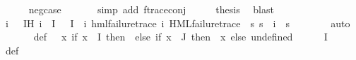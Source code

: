 \begin{isabellebody}
\ \ \ \ \isamarkupfalse%
\ neg{\isacharunderscore}{\kern0pt}case\ \isanewline
\ \ \ \ \isamarkupfalse%
\ {\isacharparenleft}{\kern0pt}simp\ add{\isacharcolon}{\kern0pt}\ f{\isacharunderscore}{\kern0pt}trace{\isacharunderscore}{\kern0pt}conj{\isacharparenright}{\kern0pt}\isanewline
\ \ \isamarkupfalse%
\ \isamarkupfalse%
\ {\isacharquery}{\kern0pt}thesis\ \isamarkupfalse%
\ blast\isanewline
{}\isamarkupfalse%
\isanewline
\ \ \isamarkupfalse%
\ {}\isanewline
\ \ \isamarkupfalse%
\ \isamarkupfalse%
\ i\ {\isasympsi}\ \ IH{\isacharcolon}{\kern0pt}\ {\isachardoublequoteopen}i{\isasymin}{\isasymPhi}\ {\isacharbackquote}{\kern0pt}\ I{\isachardoublequoteclose}\ {\isachardoublequoteopen}{\isasymPhi}\ {\isacharbackquote}{\kern0pt}\ I\ {\isacharequal}{\kern0pt}\ {\isacharbraceleft}{\kern0pt}i{\isacharbraceright}{\kern0pt}{\isachardoublequoteclose}\ {\isachardoublequoteopen}hml{\isacharunderscore}{\kern0pt}failure{\isacharunderscore}{\kern0pt}trace\ i{\isachardoublequoteclose}\ {\isachardoublequoteopen}HML{\isacharunderscore}{\kern0pt}failure{\isacharunderscore}{\kern0pt}trace\ {\isasympsi}{\isachardoublequoteclose}\ {\isachardoublequoteopen}{\isacharparenleft}{\kern0pt}{\isasymforall}s{\isachardot}{\kern0pt}\ {\isacharparenleft}{\kern0pt}s\ {\isasymTurnstile}\ i{\isacharparenright}{\kern0pt}\ {\isacharequal}{\kern0pt}\ {\isacharparenleft}{\kern0pt}s\ {\isasymTurnstile}\ {\isasympsi}{\isacharparenright}{\kern0pt}{\isacharparenright}{\kern0pt}{\isachardoublequoteclose}\isanewline
\ \ \ \ \isamarkupfalse%
\ auto\isanewline
\ \ \isamarkupfalse%
\ {\isasymPsi}\ \ \ {\isasymPsi}{\isacharunderscore}{\kern0pt}def{\isacharcolon}{\kern0pt}\ {\isachardoublequoteopen}{\isasymPsi}\ {\isacharequal}{\kern0pt}\ {\isacharparenleft}{\kern0pt}{\isasymlambda}x{\isachardot}{\kern0pt}\ if\ x\ {\isasymin}\ I\ then\ {\isasympsi}\ else\ {\isacharparenleft}{\kern0pt}if\ x\ {\isasymin}\ J\ then\ {\isasymPhi}\ x\ else\ undefined{\isacharparenright}{\kern0pt}{\isacharparenright}{\kern0pt}{\isachardoublequoteclose}\isanewline
\ \ \isamarkupfalse%
\ {\isachardoublequoteopen}{\isasymPsi}\ {\isacharbackquote}{\kern0pt}\ I\ {\isacharequal}{\kern0pt}\ {\isacharbraceleft}{\kern0pt}{\isasympsi}{\isacharbraceright}{\kern0pt}{\isachardoublequoteclose}\ \isamarkupfalse%
\ {\isasymPsi}{\isacharunderscore}{\kern0pt}def\ \isamarkupfalse%

\end{isabellebody}
